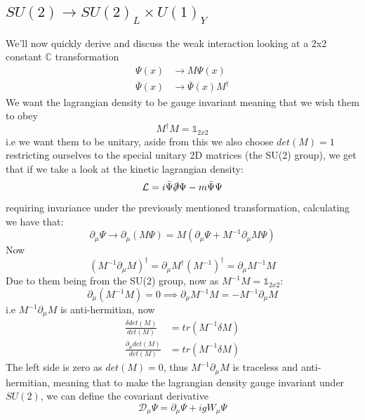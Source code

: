 \documentclass[11pt,a4paper,faculty=we,language=en,doctype=report]{cls/ugent-doc}
\begin{document}
\subsection{$SU(2) \rightarrow SU(2)_L \times U(1)_Y$}
\label{chapter:EWTheory}
We'll now quickly derive and discuss the weak interaction
looking at a 2x2 constant $\mathbb{C}$ transformation
\begin{align}
	\Psi(x) &\rightarrow M\Psi(x)\\
\bar{\Psi}(x) &\rightarrow \bar{\Psi}(x)M^\dagger
\end{align}
We want the lagrangian density to be gauge invariant meaning that we wish them to obey
\begin{equation}
	M^\dagger M = \mathbb{1}_{2x2}
\end{equation}
i.e we want them to be unitary, aside from this we also choose $det(M)=1$ restricting ourselves to
the special unitary 2D matrices (the SU(2) group), we get that if we take a look at the kinetic lagrangian
density:
\begin{equation}
	\mathcal{L} = i\bar{\Psi}\slashed{\partial}\Psi - m\bar{\Psi}\Psi
\end{equation}
requiring invariance under the previously mentioned transformation, calculating we have that:
\begin{equation}
	\partial_\mu \Psi \rightarrow \partial_\mu(M \Psi) = M(\partial_\mu \Psi + M^{-1}\partial_\mu M \Psi)
\end{equation}
Now
\begin{equation}
	(M^{-1}\partial_\mu M)^\dagger = \partial_\mu M^\dagger (M^{-1})^\dagger = \partial_\mu M^{-1}M
\end{equation}
Due to them being from the SU(2) group, now as $M^{-1}M = \mathbb{1}_{2x2}$:
\begin{equation}
	\partial_\mu (M^{-1}M) = 0 \implies \partial_\mu M^{-1}M = -M^{-1}\partial_\mu M
\end{equation}
i.e $M^{-1}\partial_\mu M$  is anti-hermitian, now 
\begin{align}
	\frac{\delta det(M)}{det(M)} &= tr(M^{-1}\delta M)\\
	\frac{\partial_\mu det(M)}{det(M)} &= tr(M^{-1}\delta M)
\end{align}
The left side is zero as $det(M)=0$, thus $M^{-1}\partial_\mu M$ is traceless and anti-hermitian,
meaning that to make the lagrangian density gauge invariant under $SU(2)$, we can define
the covariant derivative
\begin{equation}
	\mathcal{D}_\mu\Psi = \partial_\mu\Psi + igW_\mu\Psi
\end{equation}
\end{document}
